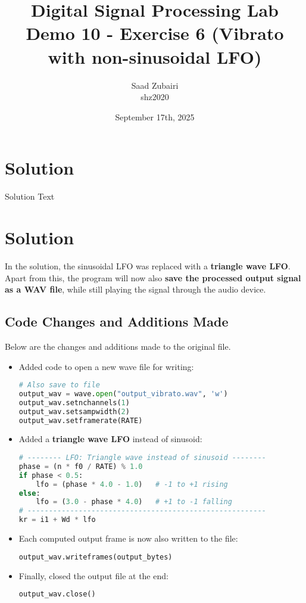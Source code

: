 \documentclass[11pt]{article}
\title{
    \vspace{3em}
    \textbf{Digital Signal Processing Lab}\\
    Demo 10 - Exercise 6 (Vibrato with non-sinusoidal LFO)
    \vspace{1em}
}
\author{
    Saad Zubairi \\ 
    shz2020 \\
    \vspace{1em}
}
\date{September 17th, 2025}
\begin{document}
\maketitle	

\pagebreak



\section*{Solution}

Solution Text


\section*{Solution}
In the solution, the sinusoidal LFO was replaced with a \textbf{triangle wave LFO}. 
Apart from this, the program will now also \textbf{save the processed output signal as a WAV file}, while still playing the signal through the audio device. 

\subsection*{Code Changes and Additions Made}
Below are the changes and additions made to the original file.

\begin{itemize}
    \item Added code to open a new wave file for writing:
    \begin{lstlisting}[language=python, caption={Open output wave file}]
# Also save to file
output_wav = wave.open("output_vibrato.wav", 'w')
output_wav.setnchannels(1)
output_wav.setsampwidth(2)
output_wav.setframerate(RATE)
    \end{lstlisting}
    
    \item Added a \textbf{triangle wave LFO} instead of sinusoid:
    \begin{lstlisting}[language=python, caption={Triangle wave LFO}]
# -------- LFO: Triangle wave instead of sinusoid --------
phase = (n * f0 / RATE) % 1.0
if phase < 0.5:
    lfo = (phase * 4.0 - 1.0)   # -1 to +1 rising
else:
    lfo = (3.0 - phase * 4.0)   # +1 to -1 falling
# --------------------------------------------------------
kr = i1 + Wd * lfo
    \end{lstlisting}
    
    \item Each computed output frame is now also written to the file:
    \begin{lstlisting}[language=python, caption={Write frames to file}]
output_wav.writeframes(output_bytes)
    \end{lstlisting}
    
    \item Finally, closed the output file at the end:
    \begin{lstlisting}[language=python, caption={Close output file}]
output_wav.close()
    \end{lstlisting}
\end{itemize}
\pagebreak
\end{document}
